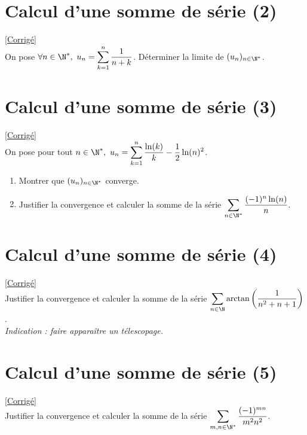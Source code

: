 \documentclass{book}
\begin{document}
	\section{Calcul d'une somme de série (2) }
	\label{Calcul d'une somme de série (2)}
	\textcolor{blue}{\hyperref[Calcul d'une somme de série (2) corrigé]{[Corrigé]}}\\
	On pose $\forall n\in \N^*,\ u_n=\displaystyle\sum\limits_{k=1}^n\frac{1}{n+k}$. Déterminer la limite de $(u_n)_{n\in \N^*}$.
	
	\section{Calcul d'une somme de série (3) }
	\label{Calcul d'une somme de série (3)}
	\textcolor{blue}{\hyperref[Calcul d'une somme de série (3) corrigé]{[Corrigé]}}\\
	On pose pour tout $n\in \N^*,\ u_n=\displaystyle\sum\limits_{k=1}^n\frac{\ln(k)}{k}-\frac{1}{2}\ln(n)^2$.
	\begin{enumerate}[leftmargin=*]
		\item Montrer que $(u_n)_{n\in \N^*}$ converge.
		\item Justifier la convergence et calculer la somme de la série $\displaystyle\sum_{n\in \N^*}\frac{(-1)^n\ln(n)}{n}$.
	\end{enumerate}
	
	\section{Calcul d'une somme de série (4) }
	\label{Calcul d'une somme de série (4)}
	\textcolor{blue}{\hyperref[Calcul d'une somme de série (4) corrigé]{[Corrigé]}}\\
	Justifier la convergence et calculer la somme de la série $\displaystyle\sum_{n\in \N}\arctan\left(\frac{1}{n^2+n+1}\right)$.\\
	\textit{Indication : faire apparaître un télescopage.}
	
	\section{Calcul d'une somme de série (5) }
	\label{Calcul d'une somme de série (5)}
	\textcolor{blue}{\hyperref[Calcul d'une somme de série (5) corrigé]{[Corrigé]}}\\
	Justifier la convergence et calculer la somme de la série $\displaystyle\sum_{m,n\in \N^*}\frac{(-1)^{mn}}{m^2n^2}$.
	
\end{document}
